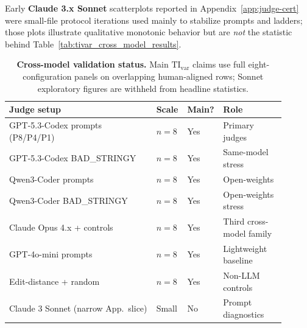 Early \textbf{Claude 3.x Sonnet} scatterplots reported in Appendix~\ref{app:judge-cert} were small-file protocol iterations used mainly to stabilize prompts and ladders; those plots illustrate qualitative monotonic behavior but are \emph{not} the statistic behind Table~\ref{tab:tivar_cross_model_results}.

\begin{table}[t]
  \centering
  \scriptsize
  \setlength{\tabcolsep}{3pt}%
  \begin{tabular}{@{}>{\raggedright\arraybackslash}p{0.52\linewidth}
    >{\centering\arraybackslash}p{0.09\linewidth}
    >{\centering\arraybackslash}p{0.07\linewidth}
    >{\raggedright\arraybackslash}p{0.22\linewidth}@{}}
    \toprule
    \textbf{Judge setup}                 &
    \textbf{Scale}                       &
    \textbf{Main?}                       &
    \textbf{Role}                                                                     \\
    \midrule
    GPT-5.3-Codex prompts (P8/P4/P1)     & \(n{=}8\) & Yes & Primary judges           \\
    GPT-5.3-Codex BAD\_STRINGY           & \(n{=}8\) & Yes & Same-model stress        \\
    Qwen3-Coder prompts                  & \(n{=}8\) & Yes & Open-weights             \\
    Qwen3-Coder BAD\_STRINGY             & \(n{=}8\) & Yes & Open-weights stress      \\
    Claude Opus 4.x + controls           & \(n{=}8\) & Yes & Third cross-model family \\
    GPT-4o-mini prompts                  & \(n{=}8\) & Yes & Lightweight baseline     \\
    Edit-distance + random               & \(n{=}8\) & Yes & Non-LLM controls         \\
    Claude 3 Sonnet (narrow App.\ slice) & Small     & No  & Prompt diagnostics       \\
    \bottomrule
  \end{tabular}
  \caption{\textbf{Cross-model validation status.} Main \(\mathrm{TI}_{\mathrm{var}}\) claims use full eight-configuration panels on overlapping human-aligned rows; Sonnet exploratory figures are withheld from headline statistics.}
  \label{tab:app-cross-model-status}
\end{table}

